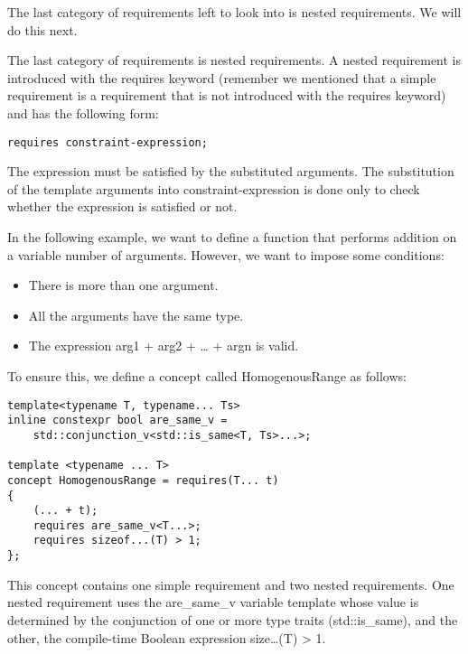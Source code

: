 The last category of requirements left to look into is nested requirements. We will do this next.


The last category of requirements is nested requirements. A nested requirement is introduced with the requires keyword (remember we mentioned that a simple requirement is a requirement that is not introduced with the requires keyword) and has the following form:

\begin{lstlisting}[style=styleCXX]
requires constraint-expression;
\end{lstlisting}

The expression must be satisfied by the substituted arguments. The substitution of the template arguments into constraint-expression is done only to check whether the expression is satisfied or not.

In the following example, we want to define a function that performs addition on a variable number of arguments. However, we want to impose some conditions:

\begin{itemize}
\item
There is more than one argument.

\item
All the arguments have the same type.

\item
The expression arg1 + arg2 + … + argn is valid.
\end{itemize}

To ensure this, we define a concept called HomogenousRange as follows:

\begin{lstlisting}[style=styleCXX]
template<typename T, typename... Ts>
inline constexpr bool are_same_v =
	std::conjunction_v<std::is_same<T, Ts>...>;
	
template <typename ... T>
concept HomogenousRange = requires(T... t)
{
	(... + t);
	requires are_same_v<T...>;
	requires sizeof...(T) > 1;
};
\end{lstlisting}

This concept contains one simple requirement and two nested requirements. One nested requirement uses the are\_same\_v variable template whose value is determined by the conjunction of one or more type traits (std::is\_same), and the other, the compile-time Boolean expression size…(T) > 1.

